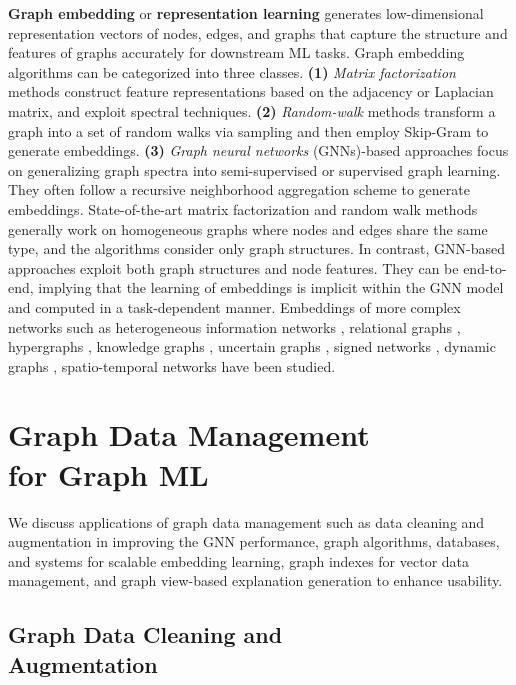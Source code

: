 \documentclass{sig-alternate-10pt}
\begin{document}
{\bf Graph embedding} or {\bf representation learning} \cite{CaiZC18,CuiWPZ19} generates low-dimensional
representation vectors of nodes, edges, and graphs that capture the structure and features of graphs accurately for downstream ML tasks.
Graph embedding algorithms can be categorized into three classes. {\bf (1)} {\em Matrix factorization} methods \cite{QiuDMLWT18}
construct feature representations based on
the adjacency or Laplacian matrix, and exploit spectral techniques.
{\bf (2)} {\em Random-walk} methods \cite{GroverL16} transform a graph into a set of random walks via sampling and then employ
Skip-Gram to generate embeddings.
{\bf (3)} {\em Graph neural networks} (GNNs)-based approaches \cite{HamiltonYL17,VelickovicCCRLB18} focus on generalizing graph spectra into semi-supervised or
supervised graph learning. They often follow a recursive neighborhood aggregation
scheme to generate embeddings. State-of-the-art matrix factorization and random walk methods
generally work on homogeneous graphs where nodes and edges share the same type, and the algorithms
consider only graph structures. In contrast, GNN-based approaches exploit both graph structures
and node features. They can be end-to-end, implying that the learning of embeddings is
implicit within the GNN model and computed in a task-dependent manner. Embeddings of more complex networks such as
heterogeneous information networks \cite{Sun00CXWY18}, relational graphs \cite{SchlichtkrullKB18}, hypergraphs \cite{ACPSSY23},
knowledge graphs \cite{AliBHVGSFTL22}, uncertain graphs \cite{HuCHFL17}, signed networks \cite{YuanWX17},
dynamic graphs \cite{BMVZ21}, spatio-temporal networks \cite{SiGXYDP22} have been studied.


\section{Graph Data Management \\ for Graph ML}
\label{sec:gdm4gml}

\medskip
\medskip

We discuss applications of graph data management such as data cleaning and augmentation in improving the GNN performance, graph algorithms, databases, and systems for scalable embedding learning, graph indexes for vector data management, and graph view-based explanation generation to enhance usability.

%
\subsection{Graph Data Cleaning and \\ Augmentation}
\label{sec:cleaning}
\end{document}
